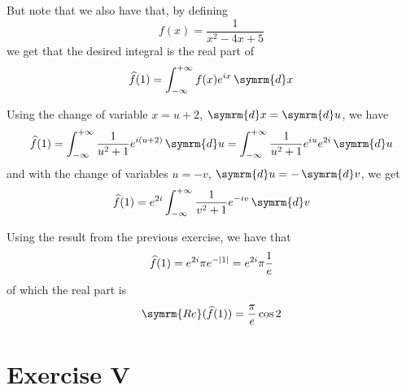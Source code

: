 \documentclass[a4paper, 12pt]{article}
\DeclarePairedDelimiter\abs{\lvert}{\rvert}%
\newcommand*\diff{\mathop{}\!\symrm{d}}
\begin{document}
\begin{enumerate}
    But note that we also have that, by defining
    \[
        f(x) = \frac{1}{x^2 - 4x + 5}
    \]
    we get that the desired integral is the real part of
    \[
        \widehat{f}(1) = \int_{-\infty}^{+\infty} f(x) e^{i x} \diff x
    \]
    
    Using the change of variable \(x = u + 2\), \(\diff x = \diff u\), we have
    \[
        \widehat{f}(1) = \int_{-\infty}^{+\infty} \frac{1}{u^2 + 1} e^{i (u + 2)} \diff u = \int_{-\infty}^{+\infty} \frac{1}{u^2 + 1} e^{i u} e^{2i} \diff u
    \]
    and with the change of variables \(u = -v\), \(\diff u = - \diff v\), we get
    \[
        \widehat{f}(1) = e^{2i} \int_{-\infty}^{+\infty} \frac{1}{v^2 + 1} e^{-iv} \diff v
    \]
    
    Using the result from the previous exercise, we have that
    \[
        \widehat{f}(1) = e^{2i} \pi e^{-\abs{1}} = e^{2i} \pi \frac{1}{e}
    \]
    of which the real part is
    \[
        \symrm{Re}(\widehat{f}(1)) = \frac{\pi}{e} \cos 2
    \]
\end{enumerate}

\section*{Exercise V}
\end{document}
